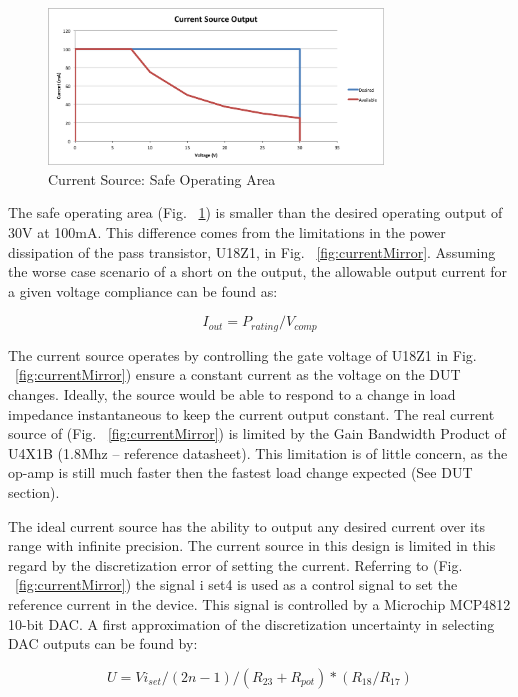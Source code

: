 \documentclass[journal]{IEEEtran}
\begin{document}
    \begin{figure}[here]
    \centering
    \includegraphics[width=3.5in]{safeOpArea}
    \caption{Current Source: Safe Operating Area}
    \label{fig:safeOpArea}
    \end{figure}

    The safe operating area (Fig.  ~\ref{fig:safeOpArea}) is smaller than the desired operating output of 30V at 100mA. This difference comes from the limitations in the power dissipation of the pass transistor, U18Z1, in Fig. ~\ref{fig:currentMirror}. Assuming the worse case scenario of a short on the output, the allowable output current for a given voltage compliance can be found as:

    \begin{equation}
    I_{out} = P_{rating} / V_{comp}
    \end{equation}

    The current source operates by controlling the gate voltage of U18Z1 in Fig. ~\ref{fig:currentMirror}) ensure a constant current as the voltage on the DUT changes. Ideally, the source would be able to respond to a change in load impedance instantaneous to keep the current output constant. The real current source of (Fig. ~\ref{fig:currentMirror}) is limited by the Gain Bandwidth Product of U4X1B (1.8Mhz – reference datasheet). This limitation is of little concern, as the op-amp is still much faster then the fastest load change expected (See DUT section).

    The ideal current source has the ability to output any desired current over its range with infinite precision. The current source in this design is limited in this regard by the discretization error of setting the current. Referring to (Fig. ~\ref{fig:currentMirror}) the signal i set4 is used as a control signal to set the reference current in the device. This signal is controlled by a Microchip MCP4812 10-bit DAC. A first approximation of the discretization uncertainty in selecting DAC outputs can be found by:


    \begin{equation}
U = Vi_{set} /(2n-1) / (R_{23} + R_{pot}) *(R_{18}/R_{17})
    \end{equation}
\end{document}
